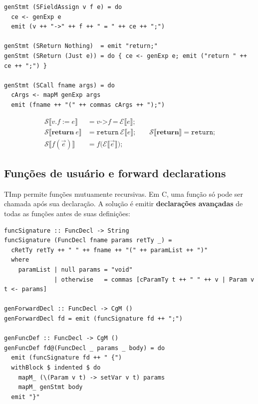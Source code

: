 \begin{verbatim}
genStmt (SFieldAssign v f e) = do
  ce <- genExp e
  emit (v ++ "->" ++ f ++ " = " ++ ce ++ ";")

genStmt (SReturn Nothing)  = emit "return;"
genStmt (SReturn (Just e)) = do { ce <- genExp e; emit ("return " ++ ce ++ ";") }

genStmt (SCall fname args) = do
  cArgs <- mapM genExp args
  emit (fname ++ "(" ++ commas cArgs ++ ");")
\end{verbatim}

\begin{Definition}\label{def:timp-stmt}
\begin{align*}
\mathcal{S}\llbracket v.f \mathrel{:=} e \rrbracket
  &= v\texttt{->}f\ \texttt{=}\ \mathcal{E}\llbracket e\rrbracket\texttt{;} \\
\mathcal{S}\llbracket \mathbf{return}\ e \rrbracket
  &= \texttt{return}\ \mathcal{E}\llbracket e\rrbracket\texttt{;} \qquad
\mathcal{S}\llbracket \mathbf{return} \rrbracket = \texttt{return;} \\
\mathcal{S}\llbracket f(\vec{e}) \rrbracket
  &= f\texttt{(}\mathcal{E}\llbracket \vec{e}\rrbracket\texttt{);}
\end{align*}
\end{Definition}

\subsection{Funções de usuário e forward declarations}

TImp permite funções mutuamente recursivas.  Em C, uma função só pode ser
chamada após sua declaração.  A solução é emitir \textbf{declarações avançadas}
de todas as funções antes de suas definições:

\begin{verbatim}
funcSignature :: FuncDecl -> String
funcSignature (FuncDecl fname params retTy _) =
  cRetTy retTy ++ " " ++ fname ++ "(" ++ paramList ++ ")"
  where
    paramList | null params = "void"
              | otherwise   = commas [cParamTy t ++ " " ++ v | Param v t <- params]

genForwardDecl :: FuncDecl -> CgM ()
genForwardDecl fd = emit (funcSignature fd ++ ";")

genFuncDef :: FuncDecl -> CgM ()
genFuncDef fd@(FuncDecl _ params _ body) = do
  emit (funcSignature fd ++ " {")
  withBlock $ indented $ do
    mapM_ (\(Param v t) -> setVar v t) params
    mapM_ genStmt body
  emit "}"
\end{verbatim}

